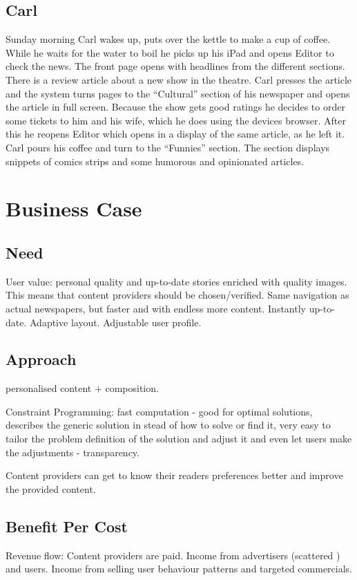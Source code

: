 \subsection{Carl}
Sunday morning Carl wakes up, puts over the kettle to make a cup of coffee. While he waits for the water to boil he picks up his iPad and opens Editor to check the news. The front page opens with headlines from the different sections. There is a review article about a new show in the theatre. Carl presses the article and the system turns pages to the ``Cultural'' section of his newspaper and opens the article in full screen. Because the show gets good ratings he decides to order some tickets to him and his wife, which he does using the devices browser. After this he reopens Editor which opens in a display of the same article, as he left it. Carl pours his coffee and turn to the ``Funnies'' section. The section displays snippets of comics strips and some humorous and opinionated articles.

\section{Business Case}

\subsection{Need}
User value: personal quality and up-to-date stories enriched with quality images. This means that content providers should be chosen/verified. Same navigation as actual newspapers, but faster and with endless more content. Instantly up-to-date. Adaptive layout. Adjustable user profile.

\subsection{Approach}
personalised content + composition.

Constraint Programming: fast computation - good for optimal solutions, describes the generic solution in stead of how to solve or find it, very easy to tailor the problem definition of the solution and adjust it and even let users make the adjustments - transparency.

Content providers can get to know their readers preferences better and improve the provided content.

\subsection{Benefit Per Cost}
Revenue flow: Content providers are paid. Income from advertisers (scattered \cite[p. 6-7]{kristin_fredrik.pdf}) and users. Income from selling user behaviour patterns and targeted commercials.

